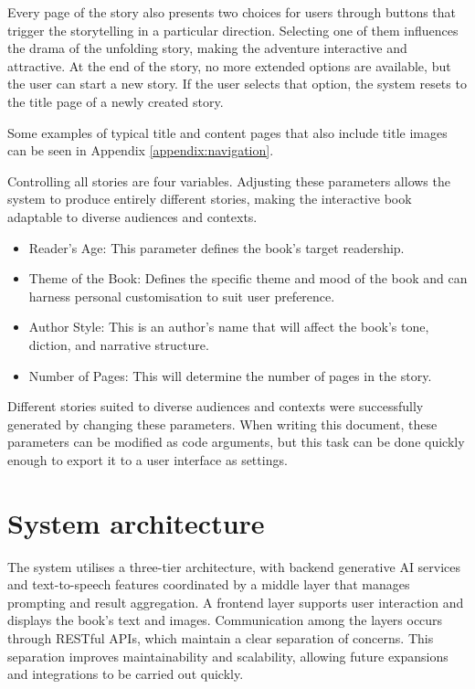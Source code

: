 \documentclass[conference]{IEEEtran}
\begin{document}
	Every page of the story also presents two choices for users through buttons that trigger the storytelling in a particular direction. Selecting one of them influences the drama of the unfolding story, making the adventure interactive and attractive. At the end of the story, no more extended options are available, but the user can start a new story. If the user selects that option, the system resets to the title page of a newly created story.
	
	Some examples of typical title and content pages that also include title images can be seen in Appendix \ref{appendix:navigation}.
	
	Controlling all stories are four variables. Adjusting these parameters allows the system to produce entirely different stories, making the interactive book adaptable to diverse audiences and contexts. 
	
	\begin{itemize}[]
		\item Reader's Age: This parameter defines the book's target readership.
		\item Theme of the Book: Defines the specific theme and mood of the book and can harness personal customisation to suit user preference.
		\item Author Style: This is an author's name that will affect the book's tone, diction, and narrative structure.
		\item Number of Pages: This will determine the number of pages in the story.
	\end{itemize}
	
	Different stories suited to diverse audiences and contexts were successfully generated by changing these parameters. When writing this document, these parameters can be modified as code arguments, but this task can be done quickly enough to export it to a user interface as settings.
	
	
	\section {System architecture}
	
	The system utilises a three-tier architecture, with backend generative AI services and text-to-speech features coordinated by a middle layer that manages prompting and result aggregation. A frontend layer supports user interaction and displays the book's text and images. Communication among the layers occurs through RESTful APIs, which maintain a clear separation of concerns. This separation improves maintainability and scalability, allowing future expansions and integrations to be carried out quickly.
	
\end{document}
